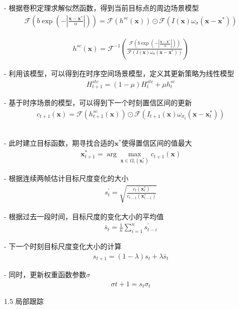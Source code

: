 - 根据卷积定理求解似然函数，得到当前目标点的周边场景模型
\begin{align}
\mathcal{F}(b\exp(-|\frac{\mathbf{x}-\mathbf{x}^{*}}{\alpha}|))=\mathcal{F}(h^{sc}(\mathbf{x}))\odot\mathcal{F}(I(\mathbf{x})\omega_\sigma(\mathbf{x}-\mathbf{x}^*))
\end{align}

\begin{align}
h^{sc}(\mathbf{x})=\mathcal{F}^{-1}(\frac{\mathcal{F}(b\exp(-|\frac{\mathbf{x}-\mathbf{x}^{*}}{\alpha}|))}{\mathcal{F}(I(\mathbf{x})\omega_\sigma(\mathbf{x}-\mathbf{x}^*))})
\end{align}

- 利用该模型，可以得到在时序空间场景模型，定义其更新策略为线性模型
\begin{align}
H^{stc}_{t+1}=(1-\mu)H^{stc}_{t}+\mu h^{sc}_t
\end{align}

- 基于时序场景的模型，可以得到下一个时刻置信区间的更新
\begin{align}
c_{t+1}(\mathbf{x})=\mathcal{F}(h^{sc}_{t+1}(\mathbf{x}))\odot\mathcal{F}(I_{t+1}(\mathbf{x})\omega_{\sigma_{t}} (\mathbf{x}-\mathbf{x}^*_t))
\end{align}
​

- 此时建立目标函数，期寻找合适的$\mathbf{x}^*$使得置信区间的值最大
\begin{align}
\mathbf{x}^{*}_{t+1}=\arg\max_{\mathbf{x}\in \Omega_c(\mathbf{x}^*_t)}c_{t+1}(\mathbf{x})
\end{align}

- 根据连续两帧估计目标尺度变化的大小
\begin{align}
s_t^{'}=\sqrt{\frac{c_t(\mathbf{x}_t^*)}{c_{t-1}(\mathbf{x}_{t-1}^*)}}
\end{align}

- 根据过去一段时间，目标尺度的变化大小的平均值
\begin{align}
\bar{s}_t=\frac{1}{n}\sum_{i=1}^{n}s_{t-i}^{'}
\end{align}

- 下一个时刻目标尺度变化大小的计算
\begin{align}
s_{t+1}=(1-\lambda)s_t+\lambda\bar{s}_t
\end{align}

- 同时，更新权重函数参数$\sigma$
\begin{align}
\sigma{t+1}=s_t\sigma_t
\end{align}




1.5 局部跟踪

